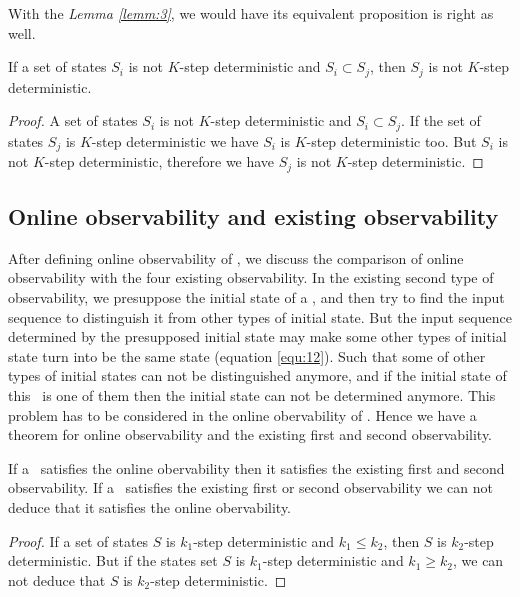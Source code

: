 With the {\em Lemma \ref{lemm:3}}, we would have its equivalent proposition is right as well.
\begin{lemma}
 If a set of states $S_i$ is not $K$-step deterministic and $S_i\subset S_j$, then $S_j$ is not $K$-step deterministic. 
  \label{lemm:5}
\end{lemma}
\begin{proof}
A set of states $S_i$ is not $K$-step deterministic and $S_i\subset S_j$. If the set of states $S_j$ is $K$-step deterministic we have $S_i$ is $K$-step deterministic too. But $S_i$ is not $K$-step deterministic, therefore we have $S_j$ is not $K$-step deterministic.
\end{proof}
\subsection{Online observability and existing observability}
After defining online observability of \BCNs, we discuss the comparison of online observability with the four existing observability. In the existing second type of observability, we presuppose the initial state of a \BCN, and then try to find the input sequence to distinguish it from other types of initial state. But the input sequence determined by the presupposed initial state may make some other types of initial state turn into be the same state (equation \ref{equ:12}). Such that some of other types of initial states can not be distinguished anymore, and if the initial state of this \BCN\ is one of them then the initial state can not be determined anymore. This problem has to be considered in the online obervability of \BCNs. Hence we have a theorem for online observability and the existing first and second observability.
\begin{theorem}
If a \BCN\ satisfies the online obervability then it satisfies the existing first and second observability. If a \BCN\ satisfies the existing first or second observability we can not deduce that it satisfies the online obervability.
\end{theorem}
\begin{proof}
 If a set of states $S$ is $k_1$-step deterministic and $k_1\leq k_2$, then $S$ is $k_2$-step deterministic. But if the states set $S$ is $k_1$-step deterministic and $k_1\geq k_2$, we can not deduce that $S$ is $k_2$-step deterministic. 
\end{proof}

